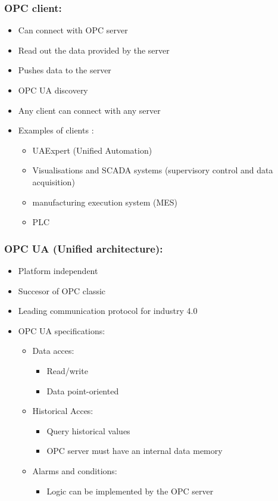 \documentclass[12pt]{article}
\begin{document}
\subsubsection{OPC client:}
\begin{itemize}
    \item Can connect with OPC server
    \item Read out the data provided by the server
    \item Pushes data to the server
    \item OPC UA discovery
    \item Any client can connect with any server
    \item Examples of clients :\begin{itemize}
        \item UAExpert (Unified Automation)
        \item Visualisations and SCADA systems
        (supervisory control and data acquisition)
        \item manufacturing execution system (MES)
        \item PLC
    \end{itemize}
\end{itemize}
\subsubsection{OPC UA (Unified architecture):}
\begin{itemize}
    \item Platform independent 
    \item Succesor of OPC classic 
    \item Leading communication protocol for industry 4.0 
    \item OPC UA specifications:\begin{itemize}
        \item Data acces:\begin{itemize}
            \item Read/write 
            \item Data point-oriented 
        \end{itemize}
        \item Historical Acces:\begin{itemize}
            \item Query historical values 
            \item OPC server must have an internal data memory
        \end{itemize}
        \item Alarms and conditions:\begin{itemize}
            \item Logic can be implemented by the OPC server
        \end{itemize}
    \end{itemize}
\end{itemize}
\end{document}
